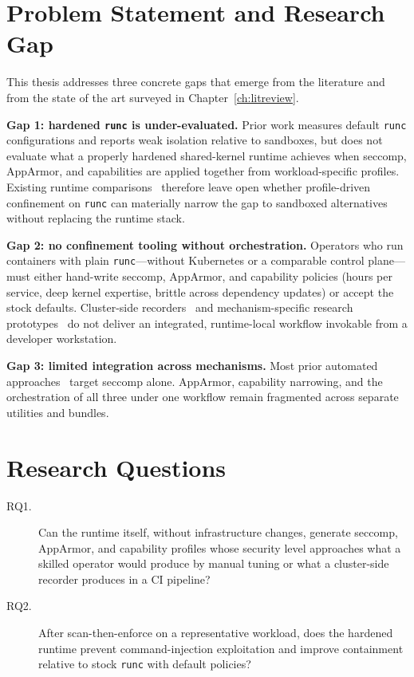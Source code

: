 \section{Problem Statement and Research Gap}

This thesis addresses three concrete gaps that emerge from the literature and from the state of the art surveyed in Chapter~\ref{ch:litreview}.

\textbf{Gap 1: hardened \texttt{runc} is under-evaluated.} Prior work measures default \texttt{runc} configurations and reports weak isolation relative to sandboxes, but does not evaluate what a properly hardened shared-kernel runtime achieves when seccomp, AppArmor, and capabilities are applied together from workload-specific profiles. Existing runtime comparisons~\cite{wang2022,volpert2024,viktorsson2020} therefore leave open whether profile-driven confinement on \texttt{runc} can materially narrow the gap to sandboxed alternatives without replacing the runtime stack.

\textbf{Gap 2: no confinement tooling without orchestration.} Operators who run containers with plain \texttt{runc}---without Kubernetes or a comparable control plane---must either hand-write seccomp, AppArmor, and capability policies (hours per service, deep kernel expertise, brittle across dependency updates) or accept the stock defaults. Cluster-side recorders~\cite{spo2025,inspektorgadget2025} and mechanism-specific research prototypes~\cite{lopes2020,canella2021} do not deliver an integrated, runtime-local workflow invokable from a developer workstation.

\textbf{Gap 3: limited integration across mechanisms.} Most prior automated approaches~\cite{lopes2020,canella2021} target seccomp alone. AppArmor, capability narrowing, and the orchestration of all three under one workflow remain fragmented across separate utilities and bundles.

\section{Research Questions}

\begin{description}
    \item[RQ1.] Can the runtime itself, without infrastructure changes, generate seccomp, AppArmor, and capability profiles whose security level approaches what a skilled operator would produce by manual tuning or what a cluster-side recorder produces in a CI pipeline?
    \item[RQ2.] After scan-then-enforce on a representative workload, does the hardened runtime prevent command-injection exploitation and improve containment relative to stock \texttt{runc} with default policies?
\end{description}

